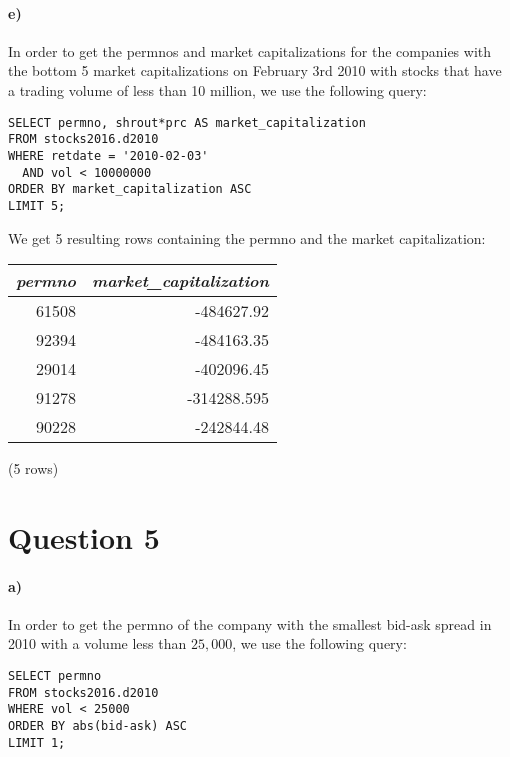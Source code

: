 \documentclass[]{article}
\let\oldparagraph\paragraph
\renewcommand{\paragraph}[1]{\oldparagraph{#1}\mbox{}}
\begin{document}
\paragraph{e)}
In order to get the permnos and market capitalizations for the companies with the bottom 5 market capitalizations on February 3rd 2010 with stocks that have a trading volume of less than 10 million, we use the following query:

\color{blue}
\begin{verbatim}
SELECT permno, shrout*prc AS market_capitalization
FROM stocks2016.d2010
WHERE retdate = '2010-02-03'
  AND vol < 10000000
ORDER BY market_capitalization ASC
LIMIT 5;
\end{verbatim}
\color{black}

We get 5 resulting rows containing the permno and the market capitalization:

\begin{center}
\begin{tabular}{|r | r|}
\hline
\textit{permno} & \textit{market\_capitalization} \\
\hline
61508 & -484627.92 \\
92394 & -484163.35 \\
29014 & -402096.45 \\
91278 & -314288.595 \\
90228 & -242844.48 \\
\hline
\end{tabular}

\noindent (5 rows) \\
\end{center}


\section*{Question 5}
\paragraph{a)}
In order to get the permno of the company with the smallest bid-ask spread in 2010 with a volume less than $25,000$, we use the following query:

\color{blue}
\begin{verbatim}
SELECT permno
FROM stocks2016.d2010
WHERE vol < 25000
ORDER BY abs(bid-ask) ASC
LIMIT 1;
\end{verbatim}
\color{black}
\end{document}
